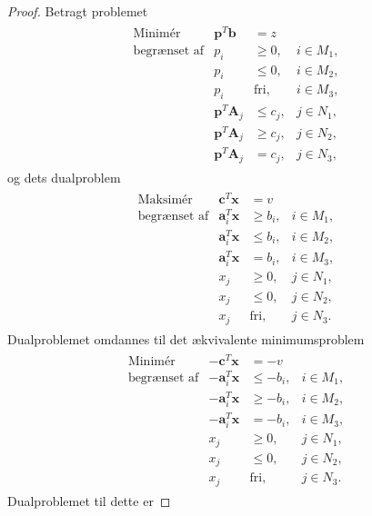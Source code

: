 \begin{proof}
Betragt problemet
\begin{align*}
\begin{array}{lrll}
\text{Minimér}		&\textbf{p}^T\textbf{b}		&= z		&\\
\text{begrænset af}	&p_i						&\geq 0,	&i \in M_1,\\
					&p_i						&\leq 0,	&i \in M_2,\\
					&p_i						&\text{fri},&i \in M_3,\\
					&\textbf{p}^T\textbf{A}_j	&\leq c_j,	&j \in N_1,\\
					&\textbf{p}^T\textbf{A}_j	&\geq c_j,	&j \in N_2,\\
					&\textbf{p}^T\textbf{A}_j	& = c_j,	&j \in N_3,
\end{array}
\end{align*}
og dets dualproblem
\begin{align*}
\begin{array}{lrll}
\text{Maksimér}		&\textbf{c}^T\textbf{x}		&= v		&\\
\text{begrænset af}	&\textbf{a}_i^T\textbf{x}	&\geq b_i,	&i \in M_1,\\
					&\textbf{a}_i^T\textbf{x}	&\leq b_i,	&i \in M_2,\\
					&\textbf{a}_i^T\textbf{x}	& = b_i,	&i \in M_3,\\
					&x_j						&\geq 0,	&j \in N_1,\\
					&x_j						&\leq 0,	&j \in N_2,\\
					&x_j						&\text{fri},&j \in N_3.
\end{array}
\end{align*}
Dualproblemet omdannes til det ækvivalente minimumsproblem
\begin{align*}
\begin{array}{lrll}
\text{Minimér}		&-\textbf{c}^T\textbf{x}	&=-v		&\\
\text{begrænset af}	&-\textbf{a}_i^T\textbf{x}	&\leq -b_i,	&i \in M_1,\\
					&-\textbf{a}_i^T\textbf{x}	&\geq -b_i,	&i \in M_2,\\
					&-\textbf{a}_i^T\textbf{x}	& = -b_i,	&i \in M_3,\\
					&x_j						&\geq 0,	&j \in N_1,\\
					&x_j						&\leq 0,	&j \in N_2,\\
					&x_j						&\text{fri},&j \in N_3.
\end{array}
\end{align*}
Dualproblemet til dette er

\end{proof}
